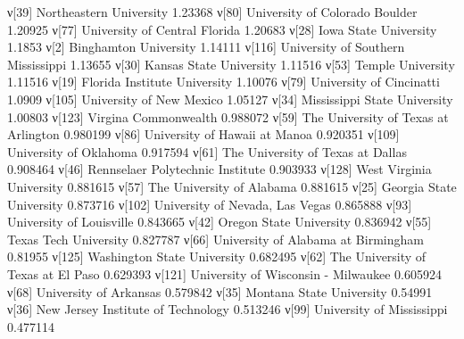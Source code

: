 ν[39]   Northeastern University                                          1.23368
ν[80]   University of Colorado Boulder                                   1.20925
ν[77]   University of Central Florida                                    1.20683
ν[28]   Iowa State University                                            1.1853
ν[2]    Binghamton University                                            1.14111
ν[116]  University of Southern Mississippi                               1.13655
ν[30]   Kansas State University                                          1.11516
ν[53]   Temple University                                                1.11516
ν[19]   Florida Institute University                                     1.10076
ν[79]   University of Cincinatti                                         1.0909
ν[105]  University of New Mexico                                         1.05127
ν[34]   Mississippi State University                                     1.00803
ν[123]  Virgina Commonwealth                                             0.988072
ν[59]   The University of Texas at Arlington                             0.980199
ν[86]   University of Hawaii at Manoa                                    0.920351
ν[109]  University of Oklahoma                                           0.917594
ν[61]   The University of Texas at Dallas                                0.908464
ν[46]   Rennselaer Polytechnic Institute                                 0.903933
ν[128]  West Virginia University                                         0.881615
ν[57]   The University of Alabama                                        0.881615
ν[25]   Georgia State University                                         0.873716
ν[102]  University of Nevada, Las Vegas                                  0.865888
ν[93]   University of Louisville                                         0.843665
ν[42]   Oregon State University                                          0.836942
ν[55]   Texas Tech University                                            0.827787
ν[66]   University of Alabama at Birmingham                              0.81955
ν[125]  Washington State University                                      0.682495
ν[62]   The University of Texas at El Paso                               0.629393
ν[121]  University of Wisconsin - Milwaukee                              0.605924
ν[68]   University of Arkansas                                           0.579842
ν[35]   Montana State University                                         0.54991
ν[36]   New Jersey Institute of Technology                               0.513246
ν[99]   University of Mississippi                                        0.477114
